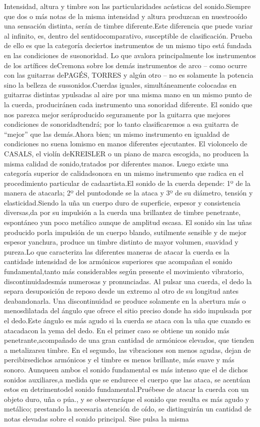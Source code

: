 \documentclass[
10pt, %
a4paper, %
oneside, %
headinclude,footinclude, %
BCOR5mm, %
]{scrartcl}
\begin{document}
{Intensidad, altura y timbre son las particularidades acústicas del sonido.Siempre que dos o más notas de la misma intensidad y altura produzcan en nuestrooído una sensación distinta, serán de timbre diferente.Este diferencia que puede variar al infinito, es, dentro del sentidocomparativo, susceptible de clasificación. Prueba de ello es que la categoría deciertos instrumentos de un mismo tipo está fundada en las condiciones de susonoridad. Lo que avalora principalmente los instrumentos de los artífices deCremona sobre los demás instrumentos de arco – como ocurre con las guitarras dePAGÉS, TORRES y algún otro – no es solamente la potencia sino la belleza de sussonidos.Cuerdas iguales, simultáneamente colocadas en guitarras distintas ypulsadas al aire por una misma mano en un mismo punto de la cuerda, produciránen cada instrumento una sonoridad diferente. El sonido que nos parezca mejor seráproducido seguramente por la guitarra que mejores condiciones de sonoridadtendrá; por lo tanto clasificaremos a esa guitarra de “mejor” que las demás.Ahora bien; un mismo instrumento en igualdad de condiciones no suena lomismo en manos diferentes ejecutantes. El violoncelo de CASALS, el violín deKREISLER o un piano de marca escogida, no producen la misma calidad de sonido,tratados por diferentes manos. Luego existe una categoría superior de calidadsonora en un mismo instrumento que radica en el procedimiento particular de cadaartista.El sonido de la cuerda depende: 1º de la manera de atacarla; 2º del puntodonde se la ataca y 3º de su diámetro, tensión y elasticidad.Siendo la uña un cuerpo duro de superficie, espesor y consistencia diversas,da por su impulsión a la cuerda una brillantez de timbre penetrante, espontáneo yun poco metálico aunque de amplitud escasa. El sonido sin las uñas producido porla impulsión de un cuerpo blando, sutilmente sensible y de mejor espesor yanchura, produce un timbre distinto de mayor volumen, suavidad y pureza.Lo que caracteriza las diferentes maneras de atacar la cuerda es la cantidade intensidad de los armónicos superiores que acompañan el sonido fundamental,tanto más considerables según presente el movimiento vibratorio, discontinuidadesmás numerosas y pronunciadas. Al pulsar una cuerda, el dedo la separa desuposición de reposo desde un extremo al otro de su longitud antes deabandonarla. Una discontinuidad se produce solamente en la abertura más o menosdilatada del ángulo que ofrece el sitio preciso donde ha sido impulsada por el dedo.Este ángulo es más agudo si la cuerda se ataca con la uña que cuando es atacadacon la yema del dedo. En el primer caso se obtiene un sonido más penetrante,acompañado de una gran cantidad de armónicos elevados, que tienden a metalizarsu timbre. En el segundo, las vibraciones son menos agudas, dejan de percibirsedichos armónicos y el timbre es menos brillante, más suave y más sonoro. Aunqueen ambos el sonido fundamental es más intenso que el de dichos sonidos auxiliares,a medida que se endurece el cuerpo que las ataca, se acentúan estos en detrimentodel sonido fundamental.Pruébese de atacar la cuerda con un objeto duro, uña o púa., y se observaráque el sonido que resulta es más agudo y metálico; prestando la necesaria atención de oído, se distinguirán un cantidad de notas elevadas sobre el sonido principal. Sise pulsa la misma }
\end{document}
